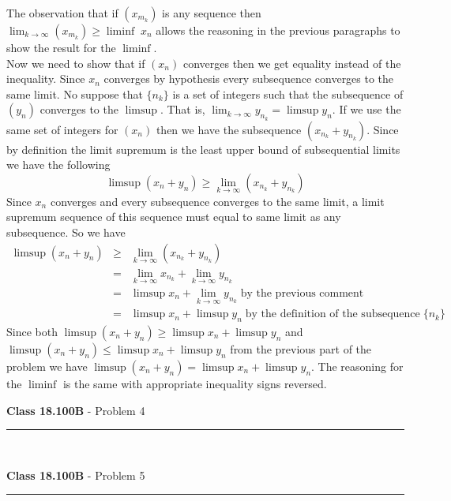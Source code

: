\documentclass[11pt,reqno]{article}
\begin{document}
The observation that if $(x_{m_k})$ is any sequence then $\lim_{k \to \infty}(x_{m_k}) \ge \liminf\; x_n$ allows the reasoning in the previous paragraphs to show the result for the $\liminf$.\\
\indent Now we need to show that if $(x_n)$ converges then we get equality instead of the inequality. Since $x_n$ converges by hypothesis every subsequence converges to the same limit. No suppose that $\{n_k\}$ is a set of integers such that the subsequence of $(y_n)$ converges to the $\limsup$. That is, $\lim_{k \to \infty}y_{n_k} = \limsup y_n$. If we use the same set of integers for $(x_n)$ then we have the subsequence $(x_{n_k} + y_{n_k} )$. Since by definition the limit supremum is the least upper bound of subsequential limits we have the following \[\limsup(x_n + y_n) \ge \lim_{k \to \infty}(x_{n_k} + y_{n_k})\]
Since $x_n$ converges and every subsequence converges to the same limit, a limit supremum sequence of this sequence must equal to same limit as any subsequence. So we have 
\begin{eqnarray*}
\limsup(x_n + y_n) & \ge & \lim_{k \to \infty}(x_{n_k} + y_{n_k})\\
                                  & = & \lim_{k \to \infty}x_{n_k} + \lim_{k \to \infty}y_{n_k}\\
                                  & = & \limsup x_n + \lim_{k \to \infty}y_{n_k} \; \text{by the previous comment}\\
                                 & = & \limsup x_n + \limsup y_n \;  \text{by the definition of the subsequence}\;\{n_k \}
\end{eqnarray*}
 Since both $\limsup(x_n + y_n) \ge \limsup x_n + \limsup y_n$ and $\limsup(x_n + y_n) \le \limsup x_n + \limsup y_n$ from the previous part of the problem we have  $\limsup(x_n + y_n) = \limsup x_n + \limsup y_n$. The reasoning for the $\liminf$ is the same with appropriate inequality signs reversed.

\vspace{15pt}
\begin{flushleft} 
\textbf{Class 18.100B} - Problem 4\\
\rule{500pt}{1pt}\\
\end{flushleft} 


\vspace{15pt}
\begin{flushleft} 
\textbf{Class 18.100B} - Problem 5\\
\rule{500pt}{1pt}\\
\end{flushleft} 
\end{document}
